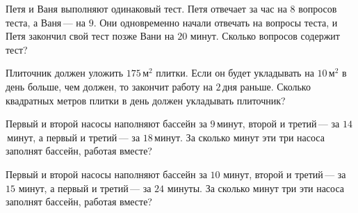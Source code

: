\begin{class}[number=5]
\begin{listofex}
		\item Петя и Ваня выполняют одинаковый тест. Петя отвечает за час на \(8\) вопросов теста, а Ваня --- на \(9\). Они одновременно начали отвечать на вопросы теста, и Петя закончил свой тест позже Вани на \(20\) минут. Сколько вопросов содержит тест?
		\item Плиточник должен уложить \(175\) м\(^2\) плитки. Если он будет укладывать на \(10\) м\(^2\) в день больше, чем должен, то закончит работу на \(2\) дня раньше. Сколько квадратных метров плитки в день должен укладывать плиточник?
		\item Первый и второй насосы наполняют бассейн за \(9\) минут, второй и третий --- за \(14\) минут, а первый и третий --- за \(18\) минут. За сколько минут эти три насоса заполнят бассейн, работая вместе?
		\item Первый и второй насосы наполняют бассейн за \(10\) минут, второй и третий --- за \(15\) минут, а первый и третий --- за \(24\) минуты. За сколько минут три эти насоса заполнят бассейн, работая вместе?
	\end{listofex}
\end{class}

